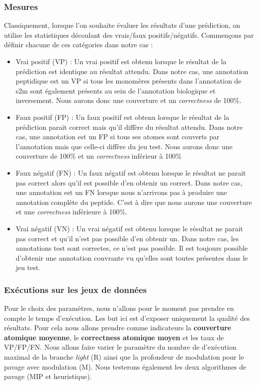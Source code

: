 \subsubsection{Mesures}

Classiquement, lorsque l'on souhaite évaluer les résultats d'une prédiction, on utilise les statistiques découlant des vrais/faux positifs/négatifs.
Commençons par définir chacune de ces catégories dans notre cas :
\begin{itemize}
 \item Vrai positif (VP) : Un vrai positif est obtenu lorsque le résultat de la prédiction est identique au résultat attendu.
Dans notre cas, une annotation peptidique est un VP si tous les monomères présents dans l'annotation de s2m sont également présents au sein de l'annotation biologique et inversement.
Nous aurons donc une couverture et un \textit{correctness} de 100\%.
 \item Faux positif (FP) : Un faux positif est obtenu lorsque le résultat de la prédiction parait correct mais qu'il diffère du résultat attendu.
Dans notre cas, une annotation est un FP si tous ses atomes sont couverts par l'annotation mais que celle-ci diffère du jeu test.
Nous aurons donc une couverture de 100\% et un \textit{correctness} inférieur à 100\%
 \item Faux négatif (FN) : Un faux négatif est obtenu lorsque le résultat ne parait pas correct alors qu'il est possible d'en obtenir un correct.
Dans notre cas, une annotation est un FN lorsque nous n'arrivons pas à produire une annotation complète du peptide.
C'est à dire que nous aurons une couverture et une \textit{correctness} inférieure à 100\%.
 \item Vrai négatif (VN) : Un vrai négatif est obtenu lorsque le résultat ne parait pas correct et qu'il n'est pas possible d'en obtenir un.
Dans notre cas, les annotations test sont correctes, ce n'est pas possible.
Il est toujours possible d'obtenir une annotation couvrante vu qu'elles sont toutes présentes dans le jeu test.
\end{itemize}


\subsubsection{Exécutions sur les jeux de données}

\label{resultats_s2m_p}

Pour le choix des paramètres, nous n'allons pour le moment pas prendre en compte le temps d'exécution.
Les but ici est d'exposer uniquement la qualité des résultats.
Pour cela nous allons prendre comme indicateurs la \textbf{couverture atomique moyenne}, le \textbf{correctness atomique moyen} et les taux de VP/FP/FN.
Nous allons faire varier le paramètre du nombre de d'exécution maximal de la branche \textit{light} (R) ainsi que la profondeur de modulation pour le pavage avec modulation (M).
Nous testerons également les deux algorithmes de pavage (MIP et heuristique).

